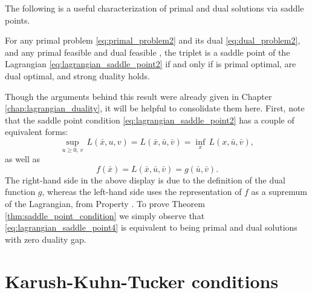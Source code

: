 The following is a useful characterization of primal and dual solutions via
saddle points.  

\begin{Theorem}
\label{thm:saddle_point_condition}
For any primal problem \eqref{eq:primal_problem2} and its dual
\eqref{eq:dual_problem2}, and any primal feasible  and dual
feasible , the triplet  is a saddle point of the Lagrangian
\eqref{eq:lagrangian_saddle_point2} if and only if  is primal
optimal,  are dual optimal, and strong duality holds.
\end{Theorem}

Though the arguments behind this result were already given in Chapter 
\ref{chap:lagrangian_duality}, it will be helpful to consolidate them here.
First, note that the saddle point condition
\eqref{eq:lagrangian_saddle_point2} has a couple of equivalent forms:
\begin{equation}
\label{eq:lagrangian_saddle_point3}
\sup_{u \geq 0, \, v} \, L(\bar{x}, u, v) = L(\bar{x}, \bar{u}, \bar{v}) =
\inf_x \, L(x, \bar{u}, \bar{v}), 
\end{equation}
as well as
\begin{equation}
\label{eq:lagrangian_saddle_point4}
f(\bar{x}) = L(\bar{x}, \bar{u}, \bar{v}) = g(\bar{u}, \bar{v}).
\end{equation}
The right-hand side in the above display is due to the definition of the dual
function $g$, whereas the left-hand side uses the representation of $f$ as a
supremum of the Lagrangian, from Property . To prove    
Theorem \ref{thm:saddle_point_condition} we simply observe that
\eqref{eq:lagrangian_saddle_point4} is equivalent to  being primal and dual solutions with zero duality gap. 

\section{Karush-Kuhn-Tucker conditions}
\label{sec:kkt_conditions}

